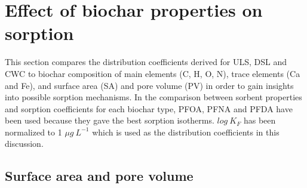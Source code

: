 
\section{Effect of biochar properties on sorption}
This section compares the distribution coefficients derived for ULS, DSL and CWC to biochar composition of main elements (C, H, O, N), trace elements (Ca and Fe), and surface area (SA) and pore volume (PV) in order to gain insights into possible sorption mechanisms. In the comparison between sorbent properties and sorption coefficients for each biochar type, PFOA, PFNA and PFDA have been used because they gave the best sorption isotherms. $log~K_F$ has been normalized to 1 $\mu g~L^{-1}$ which is used as the distribution coefficients in this discussion.

\subsection{Surface area and pore volume}

